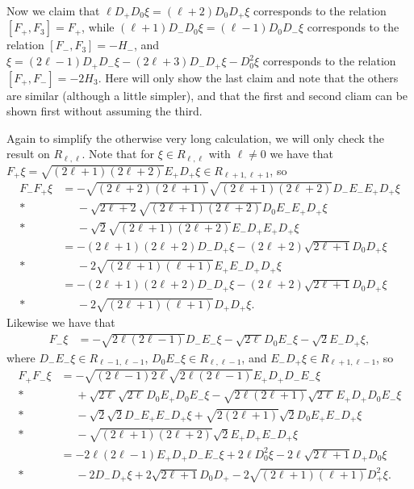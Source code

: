 Now we claim that $\ell D_+D_0\xi = (\ell+2)D_0D_+\xi$ corresponds to the relation $[F_+,F_3]=F_+$, while $(\ell+1)D_-D_0\xi = (\ell-1)D_0D_-\xi$ corresponds to the relation $[F_-,F_3]=-H_-$, and $\xi=(2\ell-1)D_+D_- \xi - (2\ell+3)D_-D_+ \xi - D_0^2 \xi$ corresponds to the relation $[F_+,F_-]=-2H_3$. Here will only show the last claim and note that the others are similar (although a little simpler), and that the first and second cliam can be shown first without assuming the third.

Again to simplify the otherwise very long calculation, we will only check the result on $R_{\ell,\ell}$. Note that for $\xi\in R_{\ell,\ell}$ with $\ell\neq 0$ we have that $F_+\xi = \sqrt{(2\ell+1)(2\ell+2)}E_+D_+\xi \in R_{\ell+1,\ell+1}$, so
\begin{align*}
  F_-F_+ \xi &= -\sqrt{(2\ell+2)(2\ell+1)}\sqrt{(2\ell+1)(2\ell+2)} D_-E_-E_+D_+ \xi \\*
           &\phantom{{}={}}{} - \sqrt{2\ell+2}\sqrt{(2\ell+1)(2\ell+2)} D_0E_-E_+D_+ \xi \\*
           &\phantom{{}={}}{} - \sqrt{2}\sqrt{(2\ell+1)(2\ell+2)}E_-D_+E_+D_+ \xi \\
           &= -(2\ell+1)(2\ell+2) D_-D_+ \xi - (2\ell+2)\sqrt{2\ell+1} D_0D_+ \xi \\*
           &\phantom{{}={}}{} - 2\sqrt{(2\ell+1)(\ell+1)} E_+E_-D_+D_+ \xi \\
           &= -(2\ell+1)(2\ell+2) D_-D_+ \xi - (2\ell+2)\sqrt{2\ell+1} D_0D_+ \xi \\*
           &\phantom{{}={}}{} - 2\sqrt{(2\ell+1)(\ell+1)} D_+D_+ \xi.
\end{align*}
Likewise we have that
\begin{align*}
  F_- \xi &= -\sqrt{2\ell(2\ell-1)}D_-E_- \xi - \sqrt{2\ell}D_0E_-\xi - \sqrt{2}E_-D_+\xi,
\end{align*}
where $D_-E_-\xi \in R_{\ell-1,\ell-1}$, $D_0E_-\xi \in R_{\ell,\ell-1}$, and $E_-D_+\xi \in R_{\ell+1,\ell-1}$, so
\begin{align*}
  F_+F_- \xi &= -\sqrt{(2\ell-1)2\ell}\sqrt{2\ell(2\ell-1)}E_+D_+D_-E_- \xi \\*
           &\phantom{{}={}}{} + \sqrt{2\ell}\sqrt{2\ell}D_0E_+D_0E_- \xi - \sqrt{2\ell(2\ell+1)}\sqrt{2\ell}E_+D_+D_0E_-\xi \\*
           &\phantom{{}={}}{} - \sqrt{2}\sqrt{2}D_-E_+E_-D_+ \xi + \sqrt{2(2\ell+1)}\sqrt{2}D_0E_+E_-D_+ \xi \\*
           &\phantom{{}={}}{} - \sqrt{(2\ell+1)(2\ell+2)}\sqrt{2} E_+D_+E_-D_+ \xi \\
           &= -2\ell(2\ell-1) E_+D_+D_-E_- \xi + 2\ell D_0^2 \xi - 2\ell\sqrt{2\ell+1}D_+D_0 \xi \\*
           &\phantom{{}={}}{} - 2 D_-D_+\xi + 2\sqrt{2\ell+1}D_0D_+ - 2\sqrt{(2\ell+1)(\ell+1)} D_+^2 \xi.
\end{align*}
